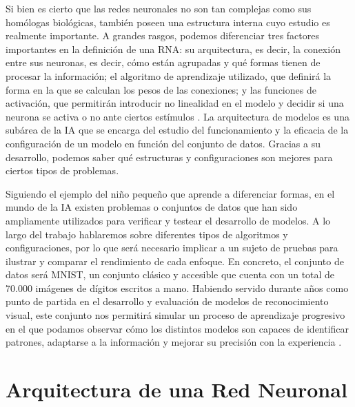 Si bien es cierto que las redes neuronales no son tan complejas como sus homólogas biológicas, también poseen una estructura interna cuyo estudio es realmente importante. A grandes rasgos, podemos diferenciar tres factores importantes en la definición de una RNA: su arquitectura, es decir, la conexión entre sus neuronas, es decir, cómo están agrupadas y qué formas tienen de procesar la información; el algoritmo de aprendizaje utilizado, que definirá la forma en la que se calculan los pesos de las conexiones; y las funciones de activación, que permitirán introducir no linealidad en el modelo y decidir si una neurona se activa o no ante ciertos estímulos \cite{nn_fundamentals__thakur_2021}. La arquitectura de modelos es una subárea de la IA que se encarga del estudio del funcionamiento y la eficacia de la configuración de un modelo en función del conjunto de datos. Gracias a su desarrollo, podemos saber qué estructuras y configuraciones son mejores para ciertos tipos de problemas.

Siguiendo el ejemplo del niño pequeño que aprende a diferenciar formas, en el mundo de la IA existen problemas o conjuntos de datos que han sido ampliamente utilizados para verificar y testear el desarrollo de modelos. A lo largo del trabajo hablaremos sobre diferentes tipos de algoritmos y configuraciones, por lo que será necesario implicar a un sujeto de pruebas para ilustrar y comparar el rendimiento de cada enfoque. En concreto, el conjunto de datos será MNIST, un conjunto clásico y accesible que cuenta con un total de 70.000 imágenes de dígitos escritos a mano. Habiendo servido durante años como punto de partida en el desarrollo y evaluación de modelos de reconocimiento visual, este conjunto nos permitirá simular un proceso de aprendizaje progresivo en el que podamos observar cómo los distintos modelos son capaces de identificar patrones, adaptarse a la información y mejorar su precisión con la experiencia \cite{yolo_docs__2024}.

\section{Arquitectura de una Red Neuronal}\label{sec:arquitectura_rna}

